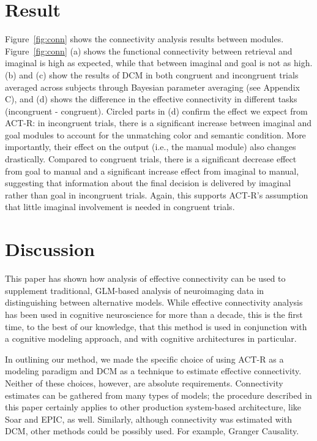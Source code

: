 \documentclass[10pt,letterpaper]{article}
\begin{document}
 
\section{Result}

Figure~\ref{fig:conn} shows the connectivity analysis results between modules. Figure~\ref{fig:conn} (a) shows the functional connectivity between retrieval and imaginal is high as expected, while that between imaginal and goal is not as high. (b) and (c) show the results of DCM in both congruent and incongruent trials averaged across subjects through Bayesian parameter averaging \cite{Kasess2010} (see Appendix C), and (d) shows the difference in the effective connectivity in different tasks (incongruent - congruent). Circled parts in (d) confirm the effect we expect from ACT-R: in incongruent trials, there is a significant increase between imaginal and goal modules to account for the unmatching color and semantic condition. More importantly, their effect on the output (i.e., the manual module) also changes drastically. Compared to congruent trials, there is a significant decrease effect from goal to manual and a significant increase effect from imaginal to manual, suggesting that information about the final decision is delivered by imaginal rather than goal in incongruent trials. Again, this supports ACT-R's assumption that little imaginal involvement is needed in congruent trials. 

\section{Discussion}

This paper has shown how analysis of effective connectivity can be used to supplement traditional, GLM-based analysis of neuroimaging data in distinguishing between alternative models. While effective connectivity analysis has been used in cognitive neuroscience for more than a decade, this is the first time, to the best of our knowledge, that this method is used in conjunction with a cognitive modeling approach, and with cognitive architectures in particular.

In outlining our method, we made the specific choice of using ACT-R as a modeling paradigm and DCM as a technique to estimate effective connectivity. Neither of these choices, however, are absolute requirements. Connectivity estimates can be gathered from many types of models; the procedure described in this paper certainly applies to other production system-based architecture, like Soar and EPIC, as well. Similarly, although connectivity was estimated with DCM,  other methods could be possibly used. For example, Granger Causality. %
\end{document}

